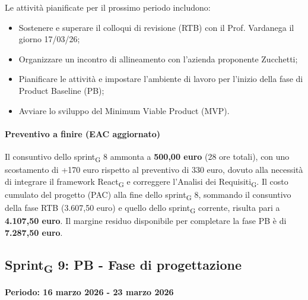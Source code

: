 \documentclass[11pt,a4paper]{article}
\newcommand{\gls}[1]{#1\textsubscript{G}}
\begin{document}
Le attività pianificate per il prossimo periodo includono:
\begin{itemize}
    \item Sostenere e superare il colloqui di revisione (RTB) con il Prof. Vardanega il giorno 17/03/26;
    \item Organizzare un incontro di allineamento con l'azienda proponente Zucchetti;
    \item Pianificare le attività e impostare l'ambiente di lavoro per l'inizio della fase di Product Baseline (PB);
    \item Avviare lo sviluppo del Minimum Viable Product (MVP).
\end{itemize}

\paragraph{Preventivo a finire (EAC aggiornato)}
Il consuntivo dello \gls{sprint} 8 ammonta a \textbf{500,00 euro} (28 ore totali), con uno scostamento di +170 euro rispetto al preventivo di 330 euro, dovuto alla necessità di integrare il framework \gls{React} e correggere l'\gls{Analisi dei Requisiti}.
Il costo cumulato del progetto (PAC) alla fine dello \gls{sprint} 8, sommando il consuntivo della fase RTB (3.607,50 euro) e quello dello \gls{sprint} corrente, risulta pari a \textbf{4.107,50 euro}. Il margine residuo disponibile per completare la fase PB è di \textbf{7.287,50 euro}.

\newpage

\subsection{\gls{Sprint} 9: PB - Fase di progettazione}
{\textbf{Periodo: 16 marzo 2026 - 23 marzo 2026}\par}
\end{document}
